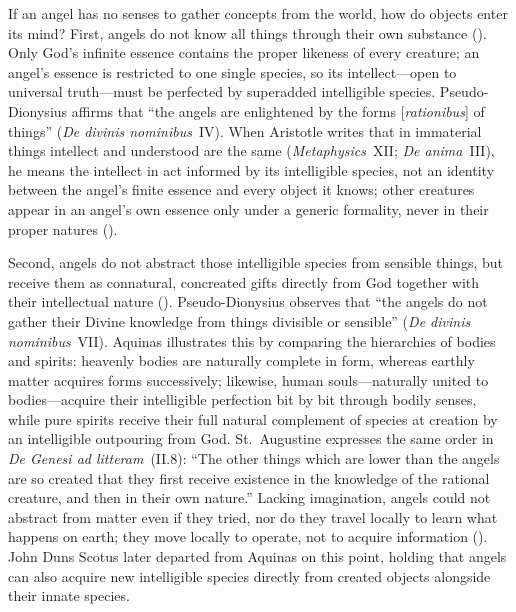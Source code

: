 If an angel has no senses to gather concepts from the world, how do objects enter its mind? First, angels do not know all things through their own substance (). Only God's infinite essence contains the proper likeness of every creature; an angel's essence is restricted to one single species, so its intellect---open to universal truth---must be perfected by superadded intelligible species. Pseudo-Dionysius affirms that ``the angels are enlightened by the forms [\emph{rationibus}] of things'' (\emph{De divinis nominibus}~IV). When Aristotle writes that in immaterial things intellect and understood are the same (\emph{Metaphysics}~XII; \emph{De anima}~III), he means the intellect in act informed by its intelligible species, not an identity between the angel's finite essence and every object it knows; other creatures appear in an angel's own essence only under a generic formality, never in their proper natures ().

Second, angels do not abstract those intelligible species from sensible things, but receive them as connatural, concreated gifts directly from God together with their intellectual nature (). Pseudo-Dionysius observes that ``the angels do not gather their Divine knowledge from things divisible or sensible'' (\emph{De divinis nominibus}~VII). Aquinas illustrates this by comparing the hierarchies of bodies and spirits: heavenly bodies are naturally complete in form, whereas earthly matter acquires forms successively; likewise, human souls---naturally united to bodies---acquire their intelligible perfection bit by bit through bodily senses, while pure spirits receive their full natural complement of species at creation by an intelligible outpouring from God. St.~Augustine expresses the same order in \emph{De Genesi ad litteram}~(II.8): ``The other things which are lower than the angels are so created that they first receive existence in the knowledge of the rational creature, and then in their own nature.'' Lacking imagination, angels could not abstract from matter even if they tried, nor do they travel locally to learn what happens on earth; they move locally to operate, not to acquire information (). John Duns Scotus later departed from Aquinas on this point, holding that angels can also acquire new intelligible species directly from created objects alongside their innate species.

